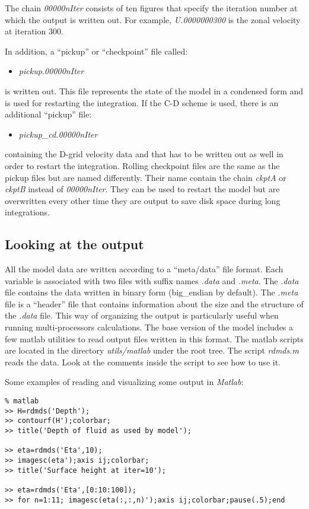 The chain \textit{00000nIter} consists of ten figures that specify the
iteration number at which the output is written out. For example, \textit{%
U.0000000300} is the zonal velocity at iteration 300.

In addition, a ``pickup'' or ``checkpoint'' file called:

\begin{itemize}
\item \textit{pickup.00000nIter}
\end{itemize}

is written out. This file represents the state of the model in a condensed
form and is used for restarting the integration. If the C-D scheme is used,
there is an additional ``pickup'' file:

\begin{itemize}
\item \textit{pickup\_cd.00000nIter}
\end{itemize}

containing the D-grid velocity data and that has to be written out as well
in order to restart the integration. Rolling checkpoint files are the same
as the pickup files but are named differently. Their name contain the chain 
\textit{ckptA} or \textit{ckptB} instead of \textit{00000nIter}. They can be
used to restart the model but are overwritten every other time they are
output to save disk space during long integrations.

\subsection{Looking at the output}

All the model data are written according to a ``meta/data'' file format.
Each variable is associated with two files with suffix names \textit{.data}
and \textit{.meta}. The \textit{.data} file contains the data written in
binary form (big\_endian by default). The \textit{.meta} file is a
``header'' file that contains information about the size and the structure
of the \textit{.data} file. This way of organizing the output is
particularly useful when running multi-processors calculations. The base
version of the model includes a few matlab utilities to read output files
written in this format. The matlab scripts are located in the directory 
\textit{utils/matlab} under the root tree. The script \textit{rdmds.m} reads
the data. Look at the comments inside the script to see how to use it.

Some examples of reading and visualizing some output in {\em Matlab}:
\begin{verbatim}
% matlab
>> H=rdmds('Depth');
>> contourf(H');colorbar;
>> title('Depth of fluid as used by model');

>> eta=rdmds('Eta',10);
>> imagesc(eta');axis ij;colorbar;
>> title('Surface height at iter=10');

>> eta=rdmds('Eta',[0:10:100]);
>> for n=1:11; imagesc(eta(:,:,n)');axis ij;colorbar;pause(.5);end
\end{verbatim}

